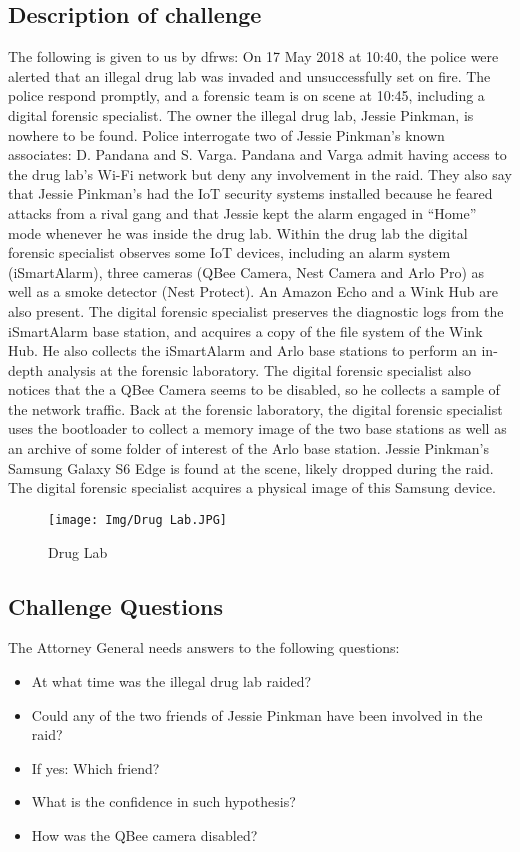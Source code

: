 \documentclass{easychair}
\begin{document}
\subsection{Description of challenge}
\label{callengescenario} The following is given to us by dfrws:
On 17 May 2018 at 10:40, the police were alerted that an illegal drug lab was invaded and
unsuccessfully set on fire. The police respond promptly, and a forensic team is on scene at 10:45,
including a digital forensic specialist.
The owner the illegal drug lab, Jessie Pinkman, is nowhere to be found. Police interrogate two of
Jessie Pinkman’s known associates: D. Pandana and S. Varga. Pandana and Varga admit having
access to the drug lab’s Wi-Fi network but deny any involvement in the raid. They also say that Jessie
Pinkman’s had the IoT security systems installed because he feared attacks from a rival gang and
that Jessie kept the alarm engaged in “Home” mode whenever he was inside the drug lab.
Within the drug lab the digital forensic specialist observes some IoT devices, including an alarm
system (iSmartAlarm), three cameras (QBee Camera, Nest Camera and Arlo Pro) as well as a smoke
detector (Nest Protect). An Amazon Echo and a Wink Hub are also present.
The digital forensic specialist preserves the diagnostic logs from the iSmartAlarm base station, and
acquires a copy of the file system of the Wink Hub. He also collects the iSmartAlarm and Arlo base
stations to perform an in-depth analysis at the forensic laboratory.
The digital forensic specialist also notices that the a QBee Camera seems to be disabled, so he
collects a sample of the network traffic.
Back at the forensic laboratory, the digital forensic specialist uses the bootloader to collect a memory
image of the two base stations as well as an archive of some folder of interest of the Arlo base station.
Jessie Pinkman's Samsung Galaxy S6 Edge is found at the scene, likely dropped during the raid.
The digital forensic specialist acquires a physical image of this Samsung device.

\begin{figure}[h]
    \centering
    \texttt{[image: Img/Drug Lab.JPG]}
    \caption{Drug Lab}
    \label{fig:Drug Lab}
\end{figure}

\subsection{Challenge Questions}
The Attorney General needs answers to the following questions:
\begin{itemize}
    \item At what time was the illegal drug lab raided?
\item Could any of the two friends of Jessie Pinkman have been involved in the raid?
\item If yes: Which friend?
\item What is the confidence in such hypothesis?
\item How was the QBee camera disabled?
\end{itemize}
\end{document}
